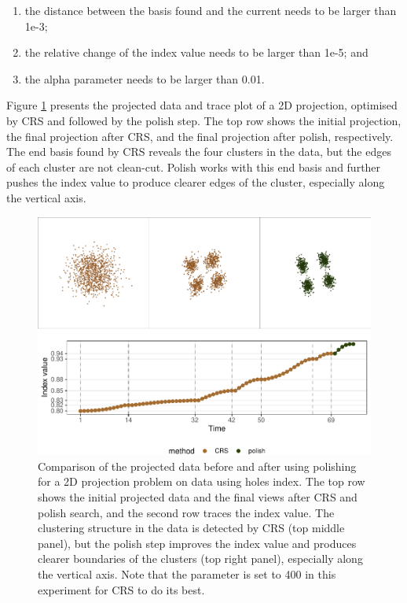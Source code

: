 \begin{enumerate}
\def\labelenumi{\arabic{enumi})}
\tightlist
\item
  the distance between the basis found and the current needs to be
  larger than 1e-3;
\item
  the relative change of the index value needs to be larger than 1e-5;
  and
\item
  the alpha parameter needs to be larger than 0.01.
\end{enumerate}

Figure \ref{fig:polish} presents the projected data and trace plot of a
2D projection, optimised by CRS and followed by the polish step. The top
row shows the initial projection, the final projection after CRS, and
the final projection after polish, respectively. The end basis found by
CRS reveals the four clusters in the data, but the edges of each cluster
are not clean-cut. Polish works with this end basis and further pushes
the index value to produce clearer edges of the cluster, especially
along the vertical axis.

\begin{Schunk}
\begin{figure}

{\centering \includegraphics[width=1\linewidth]{figs/polish} 

}

\caption{Comparison of the projected data before and after using polishing for a 2D projection problem on  data using holes index. The top row shows the initial projected data and the final views after CRS and polish search, and the second row traces the index value. The clustering structure in the data is detected by CRS (top middle panel), but the polish step improves the index value and produces clearer boundaries of the clusters (top right panel), especially along the vertical axis. Note that the parameter  is set to 400 in this experiment for CRS to do its best. }\label{fig:polish}
\end{figure}
\end{Schunk}

